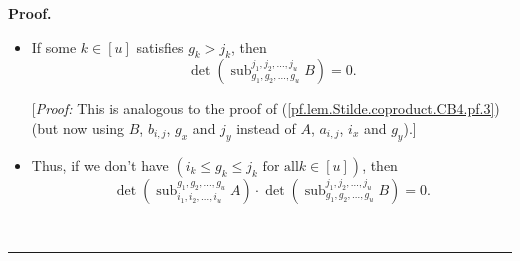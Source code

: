 \documentclass[numbers=enddot,12pt,final,onecolumn,notitlepage]{scrartcl}%
\numberwithin{exer}{section}
\theoremstyle{definition}
\newenvironment{proof}[1][Proof]{\noindent\textbf{#1.} }{\ \rule{0.5em}{0.5em}}
\theoremstyle{plainsl}
\begin{document}
\begin{proof}
\begin{itemize}
Forget that we fixed $x$ and $y$. We thus have shown that $a_{i_{x},g_{y}}=0$
for all $x\in\left\{  1,2,\ldots,k\right\}  $ and $y\in\left\{  k,k+1,\ldots
,u\right\}  $. Hence, the too-many-zeroes lemma (applied to the matrix
$\operatorname*{sub}\nolimits_{i_{1},i_{2},\ldots,i_{u}}^{g_{1},g_{2}%
,\ldots,g_{u}}A=\left(  a_{i_{x},g_{y}}\right)  _{x,y\in\left[  u\right]  }$
instead of $C=\left(  c_{x,y}\right)  _{x,y\in\left[  u\right]  }$, and to the
sets $\left\{  1,2,\ldots,k\right\}  $ and $\left\{  k,k+1,\ldots,u\right\}  $
instead of $X$ and $Y$) yields $\det\left(  \operatorname*{sub}%
\nolimits_{i_{1},i_{2},\ldots,i_{u}}^{g_{1},g_{2},\ldots,g_{u}}A\right)  =0$
(since $\underbrace{\left\vert \left\{  1,2,\ldots,k\right\}  \right\vert
}_{=k}+\underbrace{\left\vert \left\{  k,k+1,\ldots,u\right\}  \right\vert
}_{=u-k+1}=k+\left(  u-k+1\right)  =u+1>u$). This proves
(\ref{pf.lem.Stilde.coproduct.CB4.pf.3}).]

\item If some $k\in\left[  u\right]  $ satisfies $g_{k}>j_{k}$, then
\begin{equation}
\det\left(  \operatorname*{sub}\nolimits_{g_{1},g_{2},\ldots,g_{u}}%
^{j_{1},j_{2},\ldots,j_{u}}B\right)  =0.
\label{pf.lem.Stilde.coproduct.CB4.pf.4}%
\end{equation}


[\textit{Proof:} This is analogous to the proof of
(\ref{pf.lem.Stilde.coproduct.CB4.pf.3}) (but now using $B$, $b_{i,j}$,
$g_{x}$ and $j_{y}$ instead of $A$, $a_{i,j}$, $i_{x}$ and $g_{y}$).]

\item Thus, if we don't have $\left(  i_{k}\leq g_{k}\leq j_{k}\text{ for all
}k\in\left[  u\right]  \right)  $, then%
\begin{equation}
\det\left(  \operatorname*{sub}\nolimits_{i_{1},i_{2},\ldots,i_{u}}%
^{g_{1},g_{2},\ldots,g_{u}}A\right)  \cdot\det\left(  \operatorname*{sub}%
\nolimits_{g_{1},g_{2},\ldots,g_{u}}^{j_{1},j_{2},\ldots,j_{u}}B\right)  =0.
\label{pf.lem.Stilde.coproduct.CB4.pf.5}%
\end{equation}



\end{itemize}
\end{proof}
\end{document}
